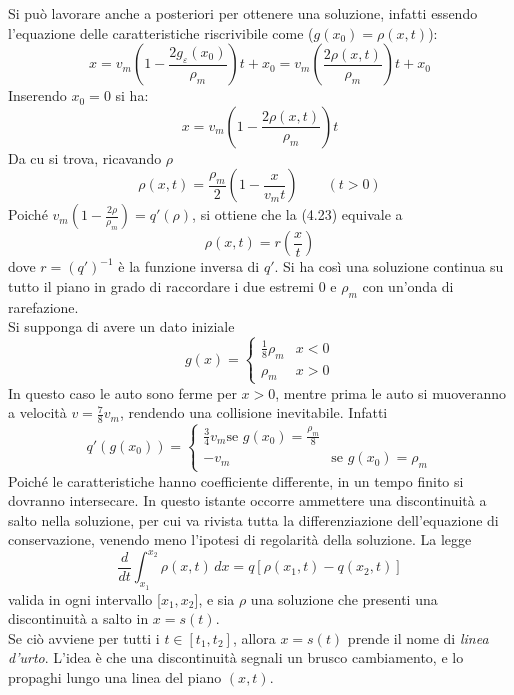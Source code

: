 \documentclass[a4paper,12pt, draft]{article}
\theoremstyle{break}
\let\epsilon\varepsilon
\numberwithin{equation}{section}
\begin{document}
Si può lavorare anche a posteriori per ottenere una soluzione, infatti essendo l'equazione delle caratteristiche riscrivibile come (\(g(x_0) = \rho(x,t)\)):
\[
  x = v_m \left(1 - \frac{2g_{\epsilon}(x_0)}{\rho_m}\right)t + x_0 = v_m \left(\frac{2\rho(x, t)}{\rho_m}\right)t + x_0 
\]
Inserendo \(x_0 = 0\) si ha:
\[
  x = v_m \left( 1 - \frac{2\rho(x,t)}{\rho_m}\right)t
\]
Da cu si trova, ricavando \(\rho\) 
\begin{equation}
  \rho(x,t) = \frac{\rho_m}{2} \left(1 - \frac{x}{v_m t}\right) \qquad (t > 0)
\end{equation}
Poiché \(v_m \left(1 - \frac{2\rho}{\rho_m}\right) = q'(\rho)\), si ottiene che la (4.23) equivale a 
\[
  \rho(x, t) = r\left(\frac{x}{t}\right)
\]
dove \(r = (q')^{-1}\) è la funzione inversa di \(q'\). Si ha così una soluzione continua su tutto il piano in grado di raccordare i due estremi \(0 \mbox{ e } \rho_m\) con un'onda di rarefazione. \\
Si supponga di avere un dato iniziale
\[
g(x) = \begin{cases}
  \frac{1}{8} \rho_m & x < 0 \\
  \rho_m & x > 0
\end{cases}  
\]
In questo caso le auto sono ferme per \(x > 0\), mentre prima le auto si muoveranno a velocità \(v = \frac{7}{8}v_m\), rendendo una collisione inevitabile. Infatti
\[
  q'(g(x_0)) = \begin{cases}
    \frac{3}{4}v_m \mbox{se } g(x_0) = \frac{\rho_m}{8} \\
    -v_m & \mbox{se }g(x_0) = \rho_m 
  \end{cases}
\]
Poiché le caratteristiche hanno coefficiente differente, in un tempo finito si dovranno intersecare. In questo istante occorre ammettere una discontinuità a salto nella soluzione, per cui va rivista tutta la differenziazione dell'equazione di conservazione, venendo meno l'ipotesi di regolarità della soluzione.
La legge 
\begin{equation}
  \frac{d}{dt} \int_{x_1}^{x_2} \rho(x,t) \, dx = q[\rho(x_1, t) - q(x_2, t)]
\end{equation}
valida in ogni intervallo [\(x_1, x_2\)], e sia \(\rho\) una soluzione che presenti una discontinuità a salto in \(x = s(t)\). \\
Se ciò avviene per tutti i \(t \in [t_1, t_2]\), allora \(x = s(t)\) prende il nome di \emph{linea d'urto}. L'idea è che una discontinuità segnali un brusco cambiamento, e lo propaghi lungo una linea del piano \((x,t)\). \\
\end{document}
